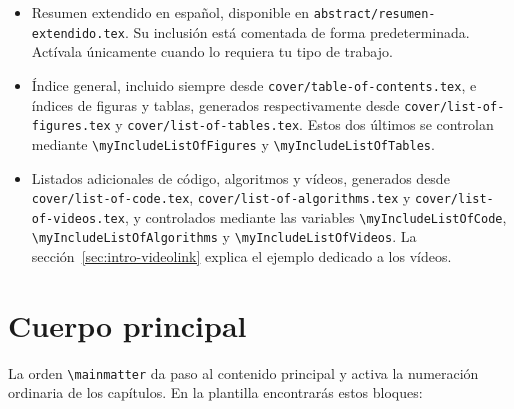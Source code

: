 \begin{itemize}
  \item Resumen extendido en español, disponible en \texttt{abstract/resumen-extendido.tex}. Su inclusión está comentada de forma predeterminada. Actívala únicamente cuando lo requiera tu tipo de trabajo.
  \item Índice general, incluido siempre desde \texttt{cover/table-of-contents.tex}, e índices de figuras y tablas, generados respectivamente desde \texttt{cover/list-of-figures.tex} y \texttt{cover/list-of-tables.tex}. Estos dos últimos se controlan mediante \texttt{\textbackslash{}myIncludeListOfFigures} y \texttt{\textbackslash{}myIncludeListOfTables}.
  \item Listados adicionales de código, algoritmos y vídeos, generados desde \texttt{cover/list-of-code.tex}, \texttt{cover/list-of-algorithms.tex} y \texttt{cover/list-of-videos.tex}, y controlados mediante las variables \texttt{\textbackslash{}myIncludeListOfCode}, \texttt{\textbackslash{}myIncludeListOfAlgorithms} y \texttt{\textbackslash{}myIncludeListOfVideos}. La sección~\ref{sec:intro-videolink} explica el ejemplo dedicado a los vídeos.
\end{itemize}

\section{Cuerpo principal}
\label{sec:cuerpo-principal}

La orden \texttt{\textbackslash{}mainmatter} da paso al contenido principal y activa la numeración ordinaria de los capítulos. En la plantilla encontrarás estos bloques:

